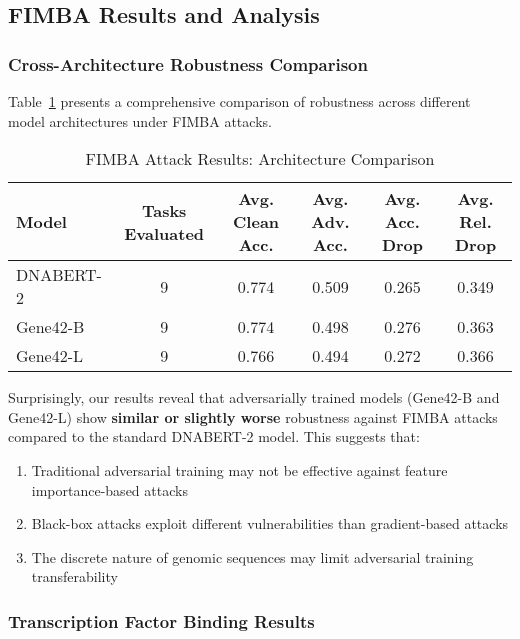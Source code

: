 \documentclass{article} %
\begin{document}
\subsection{FIMBA Results and Analysis}

\subsubsection{Cross-Architecture Robustness Comparison}

Table~\ref{tab:fimba_architecture_comparison} presents a comprehensive comparison of robustness across different model architectures under FIMBA attacks.

\begin{table}[h]
\centering
\caption{FIMBA Attack Results: Architecture Comparison}
\label{tab:fimba_architecture_comparison}
\begin{tabular}{lccccc}
\toprule
\textbf{Model} & \textbf{Tasks Evaluated} & \textbf{Avg. Clean Acc.} & \textbf{Avg. Adv. Acc.} & \textbf{Avg. Acc. Drop} & \textbf{Avg. Rel. Drop} \\
\midrule
DNABERT-2 & 9 & 0.774 & 0.509 & 0.265 & 0.349 \\
Gene42-B & 9 & 0.774 & 0.498 & 0.276 & 0.363 \\
Gene42-L & 9 & 0.766 & 0.494 & 0.272 & 0.366 \\
\bottomrule
\end{tabular}
\end{table}

Surprisingly, our results reveal that adversarially trained models (Gene42-B and Gene42-L) show \textbf{similar or slightly worse} robustness against FIMBA attacks compared to the standard DNABERT-2 model. This suggests that:

\begin{enumerate}
    \item Traditional adversarial training may not be effective against feature importance-based attacks
    \item Black-box attacks exploit different vulnerabilities than gradient-based attacks
    \item The discrete nature of genomic sequences may limit adversarial training transferability
\end{enumerate}

\subsubsection{Transcription Factor Binding Results}
\end{document}

